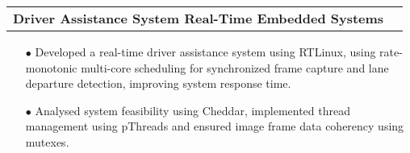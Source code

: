 \documentclass[11pt]{article}
\makeatletter
\newcommand{\resumeSubheadingP}[2]{
  \vspace{-2pt}\item
    \begin{tabular*}{1.0\textwidth}[t]{l@{\extracolsep{\fill}}r}
       \textbf{{\large #1}}&{#2} \\
    \end{tabular*}\vspace{-1pt}
}
\makeatother
\begin{document}
\resumeSubheadingP
{Driver Assistance System \textbar{ } Real-Time Embedded Systems }{}
\begin{itemize}[leftmargin=0.3in]\setlength{\itemsep}{0pt}\setlength{\parskip}{0pt}\vspace{-0.2cm}
  \item[$\bullet$] Developed a real-time driver assistance system using RTLinux, using rate-monotonic multi-core scheduling for synchronized frame capture and lane departure detection, improving system response time.
  \item[$\bullet$] Analysed system feasibility using Cheddar, implemented thread management using pThreads and ensured image frame data coherency using mutexes. 
\end{itemize}
\vspace{-0.2cm}


%


\end{document}
